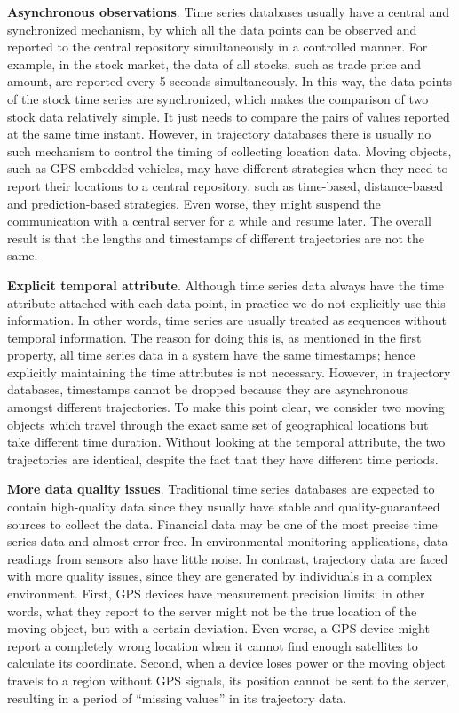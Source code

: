 \documentclass[a4paper, 12pt]{article}
\begin{document}
\textbf{Asynchronous observations}. Time series databases usually have a central and synchronized mechanism, by which all the data points can be observed and reported to the central repository simultaneously in a controlled manner. For example, in the stock market, the data of all stocks, such as trade price and amount, are reported every 5 seconds simultaneously. In this way, the data points of the stock time series are synchronized, which makes the comparison of two stock data relatively simple. It just needs to compare the pairs of values reported at the same time instant. However, in trajectory databases there is usually no such mechanism to control the timing of collecting location data. Moving objects, such as GPS embedded vehicles, may have different strategies when they need to report their locations to a central repository, such as time-based, distance-based and prediction-based strategies. Even worse, they might suspend the communication with a central server for a while and resume later. The overall result is that the lengths and timestamps of different trajectories are not the same.

\textbf{Explicit temporal attribute}. Although time series data always have the time attribute attached with each data point, in practice we do not explicitly use this information. In other words, time series are usually treated as sequences without temporal information. The reason for doing this is, as mentioned in the first property, all time series data in a system have the same timestamps; hence explicitly maintaining the time attributes is not necessary. However, in trajectory databases, timestamps cannot be dropped because they are asynchronous amongst different trajectories. To make this point clear, we consider two moving objects which travel through the exact same set of geographical locations but take different time duration. Without looking at the temporal attribute, the two trajectories are identical, despite the fact that they have different time periods.

\textbf{More data quality issues}. Traditional time series databases are expected to contain high-quality data since they usually have stable and quality-guaranteed sources to collect the data. Financial data may be one of the most precise time series data and almost error-free. In environmental monitoring applications, data readings from sensors also have little noise. In contrast, trajectory data are faced with more quality issues, since they are generated by individuals in a complex environment. First, GPS devices have measurement precision limits; in other words, what they report to the server might not be the true location of the moving object, but with a certain deviation. Even worse, a GPS device might report a completely wrong location when it cannot find enough satellites to calculate its coordinate. Second, when a device loses power or the moving object travels to a region without GPS signals, its position cannot be sent to the server, resulting in a period of “missing values” in its trajectory data.
\end{document}
